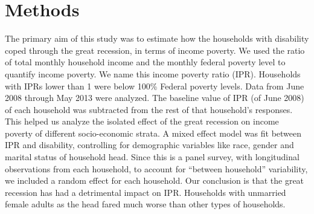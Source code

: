 \documentclass[11pt]{extarticle} %
\begin{document}
\section{Methods}
The primary aim of this study was to estimate how the households with disability coped through the great recession, in terms of income poverty. We used the ratio of total monthly household income and the monthly federal poverty level to quantify income poverty. We name this income poverty ratio (IPR).  Households with IPRs lower than 1 were below 100\% Federal poverty levels. Data from June 2008 through May 2013 were analyzed. The baseline value of IPR (of June 2008) of each household was subtracted from the rest of that household's responses. This helped us analyze the isolated effect of the great recession on income poverty of different socio-economic strata. A mixed effect model was fit between IPR and disability, controlling for demographic variables like race, gender and marital status of household head. Since this is a panel survey, with longitudinal observations from each household, to account for ``between household'' variability, we included a random effect for each household. Our conclusion is that the great recession has had a detrimental impact on IPR. Households with unmarried female adults as the head fared much worse than other types of households. 
\end{document}
